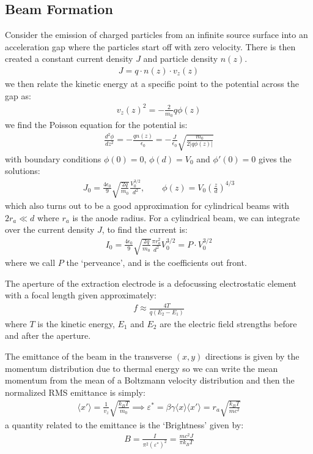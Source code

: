 \documentclass{article}
\numberwithin{equation}{section}
\begin{document}
\subsection{ Beam Formation }
Consider the emission of charged particles from an infinite source surface into an acceleration gap where the particles start off with zero velocity. There is then created a constant current density $J$ and particle density $n(z)$. 
\begin{align}
J = q \cdot n(z) \cdot v_z(z)
\end{align}
we then relate the kinetic energy at a specific point to the potential across the gap as:
\begin{align}
v_z(z)^2 = -\frac{2}{m_0} q \phi(z)
\end{align}
we find the Poisson equation for the potential is:
\begin{align}
\frac{d^2 \phi}{dz^2} = -\frac{q n(z)}{\epsilon_0} = -\frac{J }{\epsilon_0 } \sqrt{\frac{m_0}{2 |q \phi(z)| }}
\end{align}
with boundary conditions $\phi(0)=0$, $\phi(d) = V_0$ and $\phi'(0) = 0$ gives the solutions:
\begin{align}
J_0 = \frac{4 \epsilon_0}{9} \sqrt{ \frac{2 q}{m_0}} \frac{V_0^{3/2}}{d^2} ,\qquad
\phi(z) = V_0 \left( \frac{z}{d} \right)^{4/3}
\end{align}
which also turns out to be a good approximation for cylindrical beams with $2 r_a \ll d $ where $r_a$ is the anode radius. For a cylindrical beam, we can integrate over the current density $J$, to find the current is:
\begin{align}
I_0 = \frac{4 \epsilon_0}{9} \sqrt{ \frac{2 q}{m_0} } \frac{ \pi r_a^2 }{d^2} V_0^{3/2} = P \cdot V_0^{3/2}
\end{align}
where we call $P$ the `perveance', and is the coefficients out front.

The aperture of the extraction electrode is a defocussing electrostatic element with a focal length given approximately:
\begin{align}
f \approx \frac{4 T}{q(E_2-E_1)}
\end{align}
where $T$ is the kinetic energy, $E_1$ and $E_2$ are the electric field strengths before and after the aperture.

The emittance of the beam in the transverse $(x,y)$ directions is given by the momentum distribution due to thermal energy so we can write the mean momentum from the mean of a Boltzmann velocity distribution and then the normalized RMS emittance is simply:
\begin{align}
\langle x' \rangle = \frac{1}{v_z}\sqrt{\frac{k_B T}{m_0}}
\implies \varepsilon^* = \beta \gamma \langle x \rangle \langle x' \rangle = r_a \sqrt{ \frac{k_B T}{m c^2}}
\end{align}
a quantity related to the emittance is the `Brightness' given by:
\begin{align}
B = \frac{I}{\pi^2 (\varepsilon^*)^2 } = \frac{ m c^2 J}{\pi k_B T}
\end{align}
\end{document}
